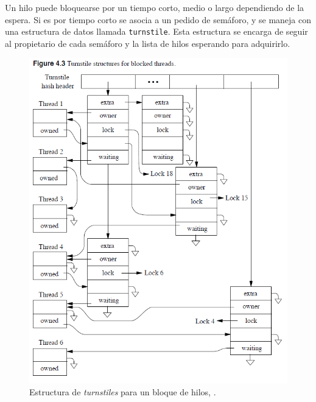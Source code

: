 \documentclass[a4paper]{book}
\begin{document}
Un hilo puede bloquearse por un tiempo corto, medio o largo dependiendo de la espera. Si es por tiempo corto se asocia a un pedido de semáforo, y se maneja con una estructura de datos llamada \verb|turnstile|. Esta estructura se encarga de seguir al propietario de cada semáforo y la lista de hilos esperando para adquirirlo.\\

\begin{figure}
	\begin{center}
		\includegraphics[scale=0.6]{./imagenes/turnstilethreads}
		\caption{Estructura de \emph{turnstiles} para un bloque de hilos, \cite[Capitulo 4]{freebsdOS}.}
	\end{center}
\end{figure}
\end{document}
